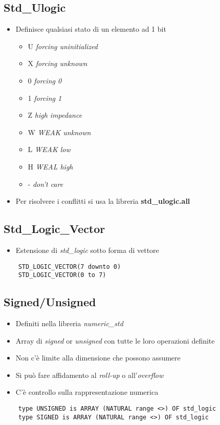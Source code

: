\documentclass{article}
\begin{document}
\subsection{Std\_Ulogic}
\begin{itemize}
	\item Definisce qualsiasi stato di un elemento ad 1 bit
	      \begin{itemize}
	      	\item U \textit{forcing uninitialized}
	      	\item X \textit{forcing unknown}
	      	\item 0 \textit{forcing 0}
	      	\item 1 \textit{forcing 1}
	      	\item Z \textit{high impedance}
	      	\item W \textit{WEAK unknown}
	      	\item L \textit{WEAK low}
	      	\item H \textit{WEAL high}
	      	\item - \textit{don't care}
	      \end{itemize}
	\item Per risolvere i conflitti si usa la libreria \textbf{std\_ulogic.all}
\end{itemize}

\subsection{Std\_Logic\_Vector}
\begin{itemize}
	\item Estensione di \textit{std\_logic} sotto forma di vettore
\end{itemize}
\begin{verbatim}
    STD_LOGIC_VECTOR(7 downto 0)
    STD_LOGIC_VECTOR(0 to 7)
\end{verbatim}

\subsection{Signed/Unsigned}
\begin{itemize} \item Definiti nella libreria \textit{numeric\_std}
	\item Array di \textit{signed} or \textit{unsigned} con tutte le loro operazioni definite
	\item Non c'è limite alla dimensione che possono assumere
	\item Si può fare affidamento al \textit{roll-up} o all'\textit{overflow}
	\item C'è controllo sulla rappresentazione numerica
\end{itemize}
\begin{verbatim}
    type UNSIGNED is ARRAY (NATURAL range <>) OF std_logic
    type SIGNED is ARRAY (NATURAL range <>) OF std_logic
\end{verbatim}
\newpage
\end{document}
